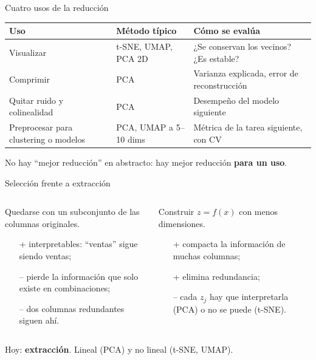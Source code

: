 \documentclass[aspectratio=169,12pt]{beamer}
\newcommand{\hrow}{\rowcolor{mlcream}}
\begin{document}
\begin{frame}{Cuatro usos de la reducción}
  \centering\footnotesize
  \begin{tabular}{@{}L{0.2\textwidth} L{0.24\textwidth} L{0.44\textwidth}@{}}
    \toprule
    \hrow \textbf{Uso} & \textbf{Método típico} & \textbf{Cómo se evalúa} \\
    \midrule
    Visualizar & t-SNE, UMAP, PCA 2D & ¿Se conservan los vecinos? ¿Es estable? \\
    Comprimir & PCA & Varianza explicada, error de reconstrucción \\
    Quitar ruido y colinealidad & PCA & Desempeño del modelo siguiente \\
    Preprocesar para clustering o modelos & PCA, UMAP a 5--10 dims & Métrica de la tarea siguiente, con CV \\
    \bottomrule
  \end{tabular}
  \raggedright
  \begin{keybox}
    \small No hay ``mejor reducción'' en abstracto: hay mejor reducción \textbf{para un uso}.
  \end{keybox}
\end{frame}

\begin{frame}{Selección frente a extracción}
  \begin{columns}[T]
    \begin{column}{0.48\textwidth}
      \begin{defbox}
        \small Quedarse con un subconjunto de las columnas originales.
        \begin{itemize}
          \item[+] interpretables: ``ventas'' sigue siendo ventas;
          \item[--] pierde la información que solo existe en combinaciones;
          \item[--] dos columnas redundantes siguen ahí.
        \end{itemize}
      \end{defbox}
    \end{column}
    \begin{column}{0.48\textwidth}
      \begin{defbox}
        \small Construir $z = f(x)$ con menos dimensiones.
        \begin{itemize}
          \item[+] compacta la información de muchas columnas;
          \item[+] elimina redundancia;
          \item[--] cada $z_j$ hay que interpretarla (PCA) o no se puede (t-SNE).
        \end{itemize}
      \end{defbox}
    \end{column}
  \end{columns}
  \vspace{4pt}
  \small Hoy: \textbf{extracción}. Lineal (PCA) y no lineal (t-SNE, UMAP).
\end{frame}
\end{document}
